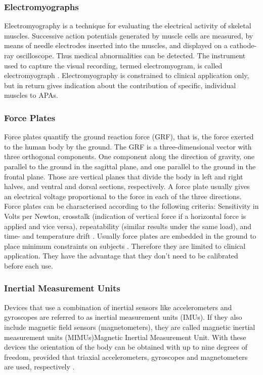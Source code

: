 \subsubsection{Electromyographs} Electromyography is a technique for evaluating the electrical activity of skeletal muscles. Successive action potentials generated by muscle cells are measured, by means of needle electrodes inserted into the muscles, and displayed on a cathode-ray oscilloscope. Thus medical abnormalities can be detected. The instrument used to capture the visual recording, termed electromyogram, is called electromyograph \cite{encyclopedia_britannica_electromyography_2014}. Electromyography is constrained to clinical application only, but in return gives indication about the contribution of specific, individual muscles to APAs.

\subsubsection{Force Plates} Force plates quantify the ground reaction force (GRF), that is, the force exerted to the human body by the ground. The GRF is a three-dimensional vector with three orthogonal components. One component along the direction of gravity, one parallel to the ground in the sagittal plane, and one parallel to the ground in the frontal plane. Those are vertical planes that divide the body in left and right halves, and ventral and dorsal sections, respectively. A force plate usually gives an electrical voltage proportional to the force in each of the three directions. Force plates can be characterised according to the following criteria: Sensitivity in Volts per Newton, crosstalk (indication of vertical force if a horizontal force is applied and vice versa), repeatability (similar results under the same load), and time- and temperature drift \cite{griffiths_principles_2006}. Usually force plates are embedded in the ground to place minimum constraints on subjects \cite{mancini_trunk_2011}. Therefore they are limited to clinical application. They have the advantage that they don't need to be calibrated before each use. 

\subsubsection{Inertial Measurement Units} Devices that use a combination of inertial sensors like accelerometers and gyroscopes are referred to as inertial measurement units (IMUs). If they also include magnetic field sensors (magnetometers), they are called magnetic inertial measurement units (MIMUs){Magnetic Inertial Measurement Unit}. With these devices the orientation of the body can be obtained with up to nine degrees of freedom, provided that triaxial accelerometers, gyroscopes and magnetometers are used, respectively \cite{olivares_vicente_signal_2013}.

